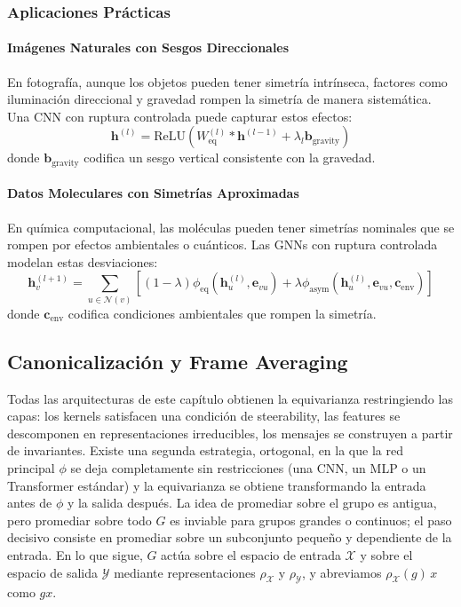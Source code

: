 \subsubsection{Aplicaciones Prácticas}

\paragraph{Imágenes Naturales con Sesgos Direccionales}

En fotografía, aunque los objetos pueden tener simetría intrínseca, factores como iluminación direccional y gravedad rompen la simetría de manera sistemática. Una CNN con ruptura controlada puede capturar estos efectos:
\begin{equation}
\mathbf{h}^{(l)} = \text{ReLU}(W_{\text{eq}}^{(l)} * \mathbf{h}^{(l-1)} + \lambda_l \mathbf{b}_{\text{gravity}})
\end{equation}
donde $\mathbf{b}_{\text{gravity}}$ codifica un sesgo vertical consistente con la gravedad.

\paragraph{Datos Moleculares con Simetrías Aproximadas}

En química computacional, las moléculas pueden tener simetrías nominales que se rompen por efectos ambientales o cuánticos. Las GNNs con ruptura controlada modelan estas desviaciones:
\begin{equation}
\mathbf{h}_v^{(l+1)} = \sum_{u \in \mathcal{N}(v)} [(1-\lambda) \phi_{\text{eq}}(\mathbf{h}_u^{(l)}, \mathbf{e}_{vu}) + \lambda \phi_{\text{asym}}(\mathbf{h}_u^{(l)}, \mathbf{e}_{vu}, \mathbf{c}_{\text{env}})]
\end{equation}
donde $\mathbf{c}_{\text{env}}$ codifica condiciones ambientales que rompen la simetría.

\subsection{Canonicalización y Frame Averaging}\label{subsec:canonicalizacion_frames}

Todas las arquitecturas de este capítulo obtienen la equivarianza restringiendo las capas: los kernels satisfacen una condición de steerability, las features se descomponen en representaciones irreducibles, los mensajes se construyen a partir de invariantes. Existe una segunda estrategia, ortogonal, en la que la red principal $\phi$ se deja completamente sin restricciones (una \gls{CNN}, un \gls{MLP} o un \gls{Transformer} estándar) y la equivarianza se obtiene transformando la entrada antes de $\phi$ y la salida después. La idea de promediar sobre el grupo es antigua, pero promediar sobre todo $G$ es inviable para grupos grandes o continuos; el paso decisivo consiste en promediar sobre un subconjunto pequeño y dependiente de la entrada. En lo que sigue, $G$ actúa sobre el espacio de entrada $\mathcal{X}$ y sobre el espacio de salida $\mathcal{Y}$ mediante representaciones $\rho_{\mathcal{X}}$ y $\rho_{\mathcal{Y}}$, y abreviamos $\rho_{\mathcal{X}}(g)\,x$ como $gx$.

